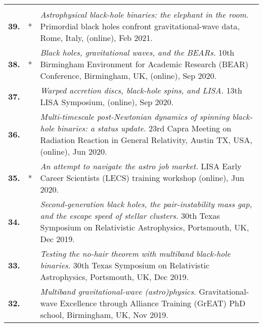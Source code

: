 {\begin{longtable}{rp{0.3cm}p{15.8cm}}
\vspace{0.05cm}\\
%
\textbf{39.} & * & \textit{Astrophysical black-hole binaries: the elephant in the room.}
\newline{}
Primordial black holes confront gravitational-wave data, Rome, Italy, (online), Feb 2021.
\vspace{0.05cm}\\
%
\textbf{38.} & * & \textit{Black holes, gravitational waves, and the BEARs.}
\newline{}
10th Birmingham Environment for Academic Research (BEAR) Conference, Birmingham, UK, (online), Sep 2020.
\vspace{0.05cm}\\
%
\textbf{37.} &  & \textit{Warped accretion discs, black-hole spins, and LISA.}
\newline{}
13th LISA Symposium, (online), Sep 2020.
\vspace{0.05cm}\\
%
\textbf{36.} &  & \textit{Multi-timescale post-Newtonian dynamics of spinning black-hole binaries: a status update.}
\newline{}
23rd Capra Meeting on Radiation Reaction in General Relativity, Austin TX, USA, (online), Jun 2020.
\vspace{0.05cm}\\
%
\textbf{35.} & * & \textit{An attempt to navigate the astro job market.}
\newline{}
LISA Early Career Scientists (LECS) training workshop (online), Jun 2020.
\vspace{0.05cm}\\
%
\textbf{34.} &  & \textit{Second-generation black holes, the pair-instability mass gap, and the escape speed of stellar clusters.}
\newline{}
30th Texas Symposium on Relativistic Astrophysics, Portsmouth, UK, Dec 2019.
\vspace{0.05cm}\\
%
\textbf{33.} &  & \textit{Testing the no-hair theorem with multiband black-hole binaries.}
\newline{}
30th Texas Symposium on Relativistic Astrophysics, Portsmouth, UK, Dec 2019.
\vspace{0.05cm}\\
%
\textbf{32.} &  & \textit{Multiband gravitational-wave (astro)physics.}
\newline{}
 Gravitational-wave Excellence through Alliance Training (GrEAT) PhD school, Birmingham, UK, Nov 2019.

\end{longtable}}
